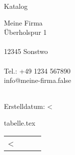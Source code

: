 \documentclass[a4paper,foldmarks=true]{scrartcl}
\makeatletter
\newcommand{\barcode}[1]{{\xlix@#1@}}
\newcommand\WG[1]{%
    \\ \pagebreak
    & \multicolumn{2}{c}{\underline{\textbf{#1}}} & \\
}
\newcommand\Zeile[5]{%
     \multirow{2}{25mm}{ \begin{picture}(25,40)(0,-12) \texttt{[image: \#1]} \end{picture} }& 
           \multicolumn{2}{p{115mm}}{\small #4} & \small #5 \\
     \nopagebreak & \small #2 & \multicolumn{1}{r}{\small #3 €}   &
            \ifthenelse{\equal{#5}{}}{}{\barcode{#5}}\\
     \\ 
}
\makeatother
\begin{document}
\fontsize{12}{15pt plus 0.15pt minus 0.1pt}\selectfont

\centering
\LARGE Katalog \\
\normal
\vspace{3cm}
\parbox{14cm}{
Meine Firma \\
Überholspur 1\\
\\
12345 Sonstwo\\
\\
Tel.: +49 1234 567890\\
info@meine-firma.false\\
}
\\
\vspace{1cm}
Erstelldatum: <%


\begin{filecontents}{tabelle.tex}

\begin{longtable}{@{}p{25mm}p{52mm}p{53mm}p{45mm}@{}} %

    \endfirsthead

    \endhead

  \endfoot

  \endlastfoot

	<%
            \ifthenelse{\equal{<%
            { \Zeile{<%
	<%

	\hline
\end{longtable}
\end{filecontents}
\end{document}
